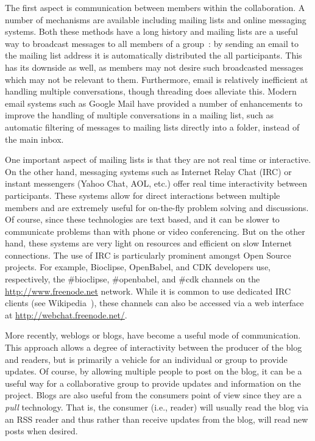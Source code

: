 \documentclass[11pt]{book}
\begin{document}
The first aspect is communication between members within the
collaboration. A number of mechanisms are available including mailing
lists and online messaging systems. Both these methods have a long
history and mailing lists are a useful way to broadcast messages to
all members of a group~\cite{wp:mailinglist}:
by sending an email to the mailing list address
it is automatically distributed the all participants.
This has its downside as well, as members
may not desire such broadcasted messages which may not be
relevant to them. Furthermore, email is
relatively inefficient at handling multiple conversations, though
threading does alleviate this. Modern email systems such as
Google Mail have provided a number of enhancements to improve the
handling of multiple conversations in a mailing list, such as
automatic filtering of messages to mailing lists directly into
a folder, instead of the main inbox.

One important aspect of mailing lists is that they are not real time
or interactive. On the other hand, messaging systems such as Internet
Relay Chat (IRC) or instant messengers (Yahoo Chat, AOL, etc.) offer
real time interactivity between participants. These systems allow for
direct interactions between multiple members and are extremely useful
for on-the-fly problem solving and discussions. Of course, since these
technologies are text based, and it can be slower to communicate
problems than with phone or video
conferencing. But on the other hand, these systems are very light on
resources and efficient on slow Internet connections. The use of
IRC is particularly prominent amongst Open Source projects. For
example, Bioclipse, OpenBabel, and CDK developers use, respectively,
the \#bioclipse, \#openbabel, and \#cdk channels on the
\url{http://www.freenode.net} network. While it is common to use
dedicated IRC clients (see Wikipedia~\cite{wp:ircclients}),
these channels can also be accessed via a web interface at
\url{http://webchat.freenode.net/}.

More recently, weblogs or blogs, have become a useful mode of
communication. This approach allows a degree of interactivity between
the producer of the blog and readers, but is primarily a vehicle for
an individual or group to provide updates. Of course, by allowing
multiple people to post on the blog, it can be a useful way for a
collaborative group to provide updates and information on the
project. Blogs are also useful from the consumers point of view since
they are a \emph{pull} technology. That is, the consumer (i.e.,
reader) will usually read the blog via an RSS reader and thus rather
than receive updates from the blog, will read new posts when desired.
\end{document}
